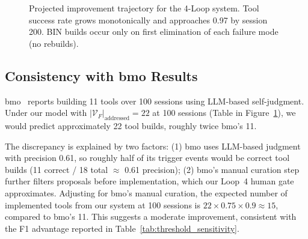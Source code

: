 \documentclass[11pt]{article}
\begin{document}
\begin{figure}[H]
\centering
{}
\caption{Projected improvement trajectory for the 4-Loop system.
Tool success rate grows monotonically and approaches 0.97 by session 200.
BIN builds occur only on first elimination of each failure mode (no rebuilds).}
\label{fig:trajectory}
\end{figure}

\subsection{Consistency with bmo Results}

bmo~\cite{bmo2024} reports building 11 tools over 100 sessions using
LLM-based self-judgment. Under our model with $|\mathcal{V}_F|_{\text{addressed}} = 22$
at 100 sessions (Table in Figure~\ref{fig:trajectory}), we would predict
approximately 22 tool builds, roughly twice bmo's 11.

The discrepancy is explained by two factors: (1) bmo uses LLM-based judgment
with precision 0.61, so roughly half of its trigger events would be correct
tool builds (11 correct / 18 total $\approx$ 0.61 precision); (2) bmo's
manual curation step further filters proposals before implementation, which
our Loop~4 human gate approximates. Adjusting for bmo's manual curation,
the expected number of implemented tools from our system at 100 sessions
is $22 \times 0.75 \times 0.9 \approx 15$, compared to bmo's 11. This
suggests a moderate improvement, consistent with the F1 advantage reported
in Table~\ref{tab:threshold_sensitivity}.
\end{document}

